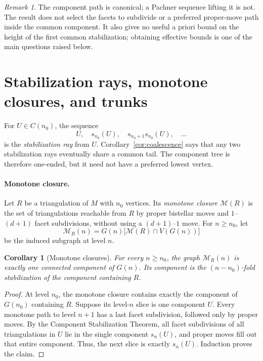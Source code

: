 \documentclass[11pt]{article}
\newtheorem{corollary}[theorem]{Corollary}
\theoremstyle{remark}
\newtheorem{remark}[theorem]{Remark}
\theoremstyle{plain}
\begin{document}
\begin{remark}
The component path is canonical; a Pachner sequence lifting it is not.  The
result does not select the facets to subdivide or a preferred proper-move path
inside the common component.  It also gives no useful a priori bound on the
height of the first common stabilization; obtaining effective bounds is one
of the main questions raised below.
\end{remark}

\section{Stabilization rays, monotone closures, and trunks}
\label{sec:rays}

For \(U\in C(n_0)\), the sequence
\[
 U,\quad s_{n_0}(U),\quad
 s_{n_0+1}s_{n_0}(U),\quad\ldots
\]
is the \emph{stabilization ray} from \(U\).  Corollary~\ref{cor:coalescence}
says that any two stabilization rays eventually share a common tail.  The
component tree is therefore one-ended, but it need not have a preferred
lowest vertex.

\paragraph{Monotone closure.}
Let \(R\) be a triangulation of \(M\) with \(n_0\) vertices.  Its
\emph{monotone closure} \(\mathcal M(R)\) is the set of triangulations
reachable from \(R\) by proper bistellar moves and
\(1\)--\((d+1)\) facet subdivisions, without using a
\((d+1)\)--\(1\) move.  For \(n\ge n_0\), let
\[
 \mathcal M_R(n)
 =G(n)\bigl[\mathcal M(R)\cap V(G(n))\bigr]
\]
be the induced subgraph at level \(n\).

\begin{corollary}[Monotone closures]
\label{cor:monotone-closure}
For every \(n\ge n_0\), the graph \(\mathcal M_R(n)\) is exactly one
connected component of \(G(n)\).  Its component is the
\((n-n_0)\)-fold stabilization of the component containing \(R\).
\end{corollary}

\begin{proof}
At level \(n_0\), the monotone closure contains exactly the component of
\(G(n_0)\) containing \(R\).  Suppose its level-\(n\) slice is one component
\(U\).  Every monotone path to level \(n+1\) has a last facet subdivision,
followed only by proper moves.  By the Component Stabilization Theorem, all
facet subdivisions of all triangulations in \(U\) lie in the single
component \(s_n(U)\), and proper moves fill out that entire component.  Thus,
the next slice is exactly \(s_n(U)\).  Induction proves the claim.
\end{proof}
\end{document}
